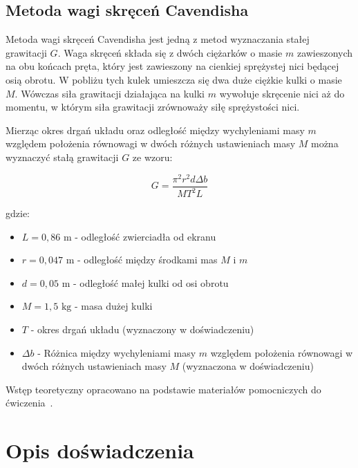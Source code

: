 \documentclass[a4paper,12pt]{article}
\begin{document}
\subsection*{Metoda wagi skręceń Cavendisha}

Metoda wagi skręceń Cavendisha jest jedną z metod wyznaczania stałej grawitacji $G$. Waga skręceń składa się z dwóch ciężarków o masie $m$ zawieszonych na obu końcach pręta, który jest zawieszony na cienkiej sprężystej nici będącej osią obrotu. W pobliżu tych kulek umieszcza się dwa duże ciężkie kulki o masie $M$. Wówczas siła grawitacji działająca na kulki $m$ wywołuje skręcenie nici aż do momentu, w którym siła grawitacji zrównoważy siłę sprężystości nici.

Mierząc okres drgań układu oraz odległość między wychyleniami masy $m$ względem położenia równowagi w dwóch różnych ustawieniach masy $M$ można wyznaczyć stałą grawitacji $G$ ze wzoru:

\begin{equation}
    \label{eq:g_cavendish}
    G = \frac{\pi^2 r^2 d \Delta b}{MT^2 L}
\end{equation}

gdzie:
\begin{itemize}
    \setlength{\itemsep}{0em}
    \item $L = 0{,}86\text{ m}$ - odległość zwierciadła od ekranu
    \item $r = 0{,}047\text{ m}$ - odległość między środkami mas $M$ i $m$
    \item $d = 0{,}05\text{ m}$ - odległość małej kulki od osi obrotu
    \item $M = 1{,}5\text{ kg}$ - masa dużej kulki
    \item $T$ - okres drgań układu (wyznaczony w doświadczeniu)
    \item $\Delta b$ - Różnica między wychyleniami masy $m$ względem położenia równowagi w dwóch różnych ustawieniach masy $M$ (wyznaczona w doświadczeniu)
\end{itemize}


Wstęp teoretyczny opracowano na podstawie materiałów pomocniczych do ćwiczenia~\cite{materialy_pomoc_19}.


\section{Opis doświadczenia}
\end{document}
